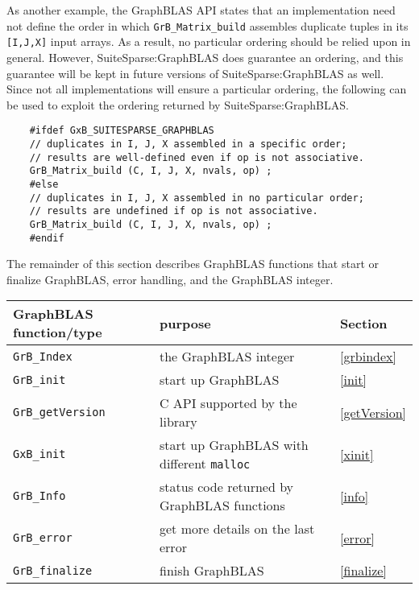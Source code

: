 \documentclass[12pt]{article}
\begin{document}
As another example, the GraphBLAS API states that an
implementation need not define the order in which \verb'GrB_Matrix_build'
assembles duplicate tuples in its \verb'[I,J,X]' input arrays.  As a result, no
particular ordering should be relied upon in general.  However,
SuiteSparse:GraphBLAS does guarantee an ordering, and this guarantee will be
kept in future versions of SuiteSparse:GraphBLAS as well.  Since not all
implementations will ensure a particular ordering, the following can be used to
exploit the ordering returned by SuiteSparse:GraphBLAS.

    {\footnotesize
    \begin{verbatim}
    #ifdef GxB_SUITESPARSE_GRAPHBLAS
    // duplicates in I, J, X assembled in a specific order;
    // results are well-defined even if op is not associative.
    GrB_Matrix_build (C, I, J, X, nvals, op) ;
    #else
    // duplicates in I, J, X assembled in no particular order;
    // results are undefined if op is not associative.
    GrB_Matrix_build (C, I, J, X, nvals, op) ;
    #endif \end{verbatim}}

The remainder of this section describes GraphBLAS functions that start or finalize GraphBLAS,
error handling, and the GraphBLAS integer.

\vspace{0.2in}
{\footnotesize
\begin{tabular}{lll}
\hline
GraphBLAS function/type   & purpose                                 & Section \\
\hline
\verb'GrB_Index'     & the GraphBLAS integer                        & \ref{grbindex} \\
\verb'GrB_init'      & start up GraphBLAS                           & \ref{init} \\
\verb'GrB_getVersion'& C API supported by the library               & \ref{getVersion} \\
\verb'GxB_init'      & start up GraphBLAS with different \verb'malloc' & \ref{xinit} \\
\verb'GrB_Info'      & status code returned by GraphBLAS functions  & \ref{info} \\
\verb'GrB_error'     & get more details on the last error           & \ref{error} \\
\verb'GrB_finalize'  & finish GraphBLAS                             & \ref{finalize} \\
\hline
\end{tabular}
}
\vspace{0.2in}
\end{document}
